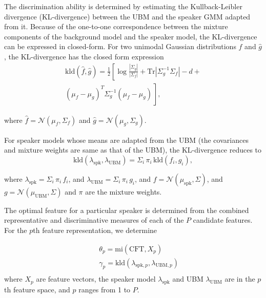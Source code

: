\documentclass{article}
\begin{document}
The discrimination ability
is determined by estimating the Kullback-Leibler divergence (KL-divergence)
between the UBM and the speaker GMM adapted from it. Because of the one-to-one
correspondence between the mixture components of the background model and the
speaker model, the KL-divergence can be expressed in closed-form. 
For two unimodal Gaussian distributions $\hat{f}$ and $\hat{g}$, the KL-divergence has the closed form
expression
\begin{equation}
\begin{split}
\textrm{kld}(\hat{f},\hat{g}) = \frac{1}{2}\left[ \log \frac{|\Sigma_g|}{|\Sigma_f|} +
	\textrm{Tr}|\Sigma^{-1}_g\Sigma_f| - d + \right. \\ 
\left. (\mu_f-\mu_g)^T\Sigma_g^{-1}(\mu_f-\mu_g) \frac{}{} \right], 
\end{split}
\label{eq:kldGaussians}
\end{equation}

where $\hat{f} = \mathcal{N}(\mu_f,\Sigma_f)$ and $\hat{g} = \mathcal{N}(\mu_g,\Sigma_g)$.

For speaker models whose means are adapted from the UBM (the 
covariances and mixture weights are same as that of the UBM), the KL-divergence
reduces to 
\begin{equation}
\textrm{kld}(\lambda_{\textrm{spk}},\lambda_{\textrm{UBM}}) = 
	\Sigma_i\, \pi_i\, \textrm{kld}(f_i,g_i),
\label{eq:gmmAdaptedKLD}
\end{equation}


where $\lambda_{\textrm{spk}} = \Sigma_i \, \pi_i \, f_i$, and
$\lambda_{\textrm{UBM}} = \Sigma_i \, \pi_i \, g_i$, and
$f = \mathcal{N}(\mu_{\textrm{spk}},\Sigma)$, and
$g = \mathcal{N}(\mu_{\textrm{UBM}},\Sigma)$ and
$\pi$ are the mixture weights.


The optimal feature for a particular speaker is determined from the combined
representative and discriminative measures of each of the $P$ candidate
features. For the $p$th feature representation, we determine

\begin{eqnarray*}
&& \theta_p = \textrm{mi}(\textrm{CFT},X_{p}) \\ && \gamma_p =
\textrm{kld}(\lambda_{\textrm{spk},p},\lambda_{\textrm{UBM},p}) \\
\end{eqnarray*} 
where $X_p$ are feature vectors, the speaker model $\lambda_{\textrm{spk}}$ and 
UBM $\lambda_{\textrm{UBM}}$ are in the $p$th feature space, and $p$ ranges from 1 to $P$.
\end{document}
